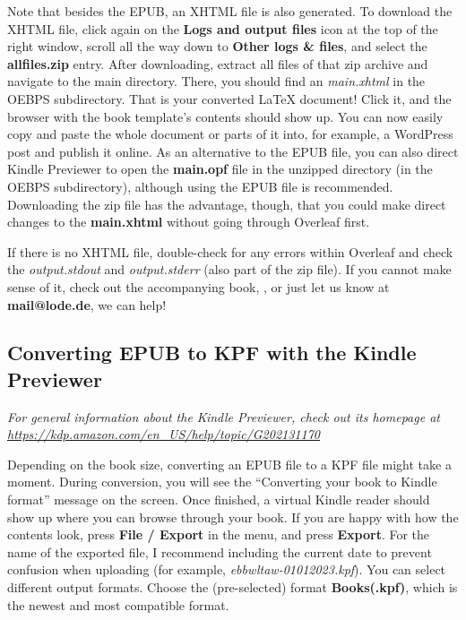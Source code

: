 Note that besides the EPUB, an XHTML file is also generated. To download the XHTML file, click again on the \textbf{Logs and output files} icon at the top of the right window, scroll all the way down to \textbf{Other logs \& files}, and select the \textbf{allfiles.zip} entry. After downloading, extract all files of that zip archive and navigate to the main directory. There, you should find an \textit{main.xhtml} in the OEBPS subdirectory. That is your converted LaTeX document! Click it, and the browser with the book template's contents should show up. You can now easily copy and paste the whole document or parts of it into, for example, a WordPress post and publish it online. As an alternative to the EPUB file, you can also direct Kindle Previewer to open the \textbf{main.opf} file in the unzipped directory (in the OEBPS subdirectory), although using the EPUB file is recommended. Downloading the zip file has the advantage, though, that you could make direct changes to the \textbf{main.xhtml} without going through Overleaf first.

If there is no XHTML file, double\hyp{}check for any errors within Overleaf and check the \textit{output.stdout} and \textit{output.stderr} (also part of the zip file). If you cannot make sense of it, check out the accompanying book, , or just let us know at \textbf{mail@lode.de}, we can help!


\subsection{Converting EPUB to KPF with the Kindle Previewer}

\textit{For general information about the Kindle Previewer, check out its homepage at \url{https://kdp.amazon.com/en_US/help/topic/G202131170}}

Depending on the book size, converting an EPUB file to a KPF file might take a moment. During conversion, you will see the ``Converting your book to Kindle format'' message on the screen. Once finished, a virtual Kindle reader should show up where you can browse through your book. If you are happy with how the contents look, press \textbf{File / Export} in the menu, and press \textbf{Export}. For the name of the exported file, I recommend including the current date to prevent confusion when uploading (for example, \textit{ebbwltaw-01012023.kpf}). You can select different output formats. Choose the (pre-selected) format \textbf{Books(.kpf)}, which is the newest and most compatible format.


